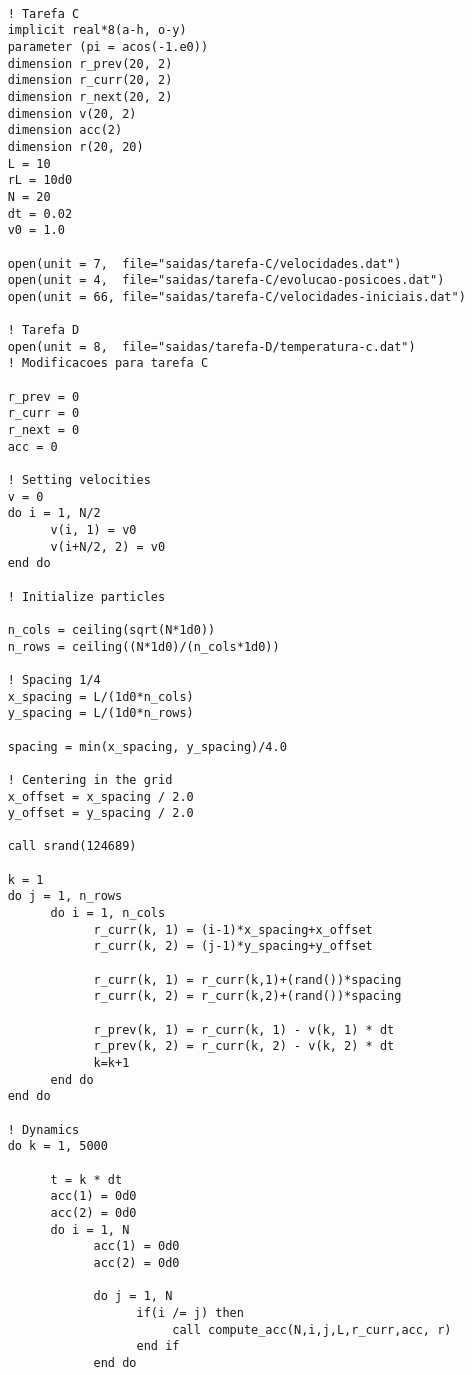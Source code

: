 \begin{verbatim}

    ! Tarefa C
    implicit real*8(a-h, o-y)
    parameter (pi = acos(-1.e0))
    dimension r_prev(20, 2)
    dimension r_curr(20, 2)
    dimension r_next(20, 2)
    dimension v(20, 2)
    dimension acc(2)
    dimension r(20, 20)
    L = 10
    rL = 10d0
    N = 20
    dt = 0.02
    v0 = 1.0

    open(unit = 7,  file="saidas/tarefa-C/velocidades.dat")
    open(unit = 4,  file="saidas/tarefa-C/evolucao-posicoes.dat")
    open(unit = 66, file="saidas/tarefa-C/velocidades-iniciais.dat")

    ! Tarefa D
    open(unit = 8,  file="saidas/tarefa-D/temperatura-c.dat")
    ! Modificacoes para tarefa C

    r_prev = 0 
    r_curr = 0 
    r_next = 0
    acc = 0 

    ! Setting velocities 
    v = 0 
    do i = 1, N/2
          v(i, 1) = v0
          v(i+N/2, 2) = v0
    end do

    ! Initialize particles 

    n_cols = ceiling(sqrt(N*1d0))
    n_rows = ceiling((N*1d0)/(n_cols*1d0)) 

    ! Spacing 1/4 
    x_spacing = L/(1d0*n_cols)
    y_spacing = L/(1d0*n_rows)

    spacing = min(x_spacing, y_spacing)/4.0 

    ! Centering in the grid
    x_offset = x_spacing / 2.0 
    y_offset = y_spacing / 2.0

    call srand(124689)

    k = 1 
    do j = 1, n_rows 
          do i = 1, n_cols 
                r_curr(k, 1) = (i-1)*x_spacing+x_offset
                r_curr(k, 2) = (j-1)*y_spacing+y_offset

                r_curr(k, 1) = r_curr(k,1)+(rand())*spacing
                r_curr(k, 2) = r_curr(k,2)+(rand())*spacing

                r_prev(k, 1) = r_curr(k, 1) - v(k, 1) * dt 
                r_prev(k, 2) = r_curr(k, 2) - v(k, 2) * dt 
                k=k+1
          end do 
    end do

    ! Dynamics 
    do k = 1, 5000

          t = k * dt 
          acc(1) = 0d0 
          acc(2) = 0d0
          do i = 1, N 
                acc(1) = 0d0 
                acc(2) = 0d0

                do j = 1, N 
                      if(i /= j) then
                           call compute_acc(N,i,j,L,r_curr,acc, r)
                      end if
                end do 


\end{verbatim}
